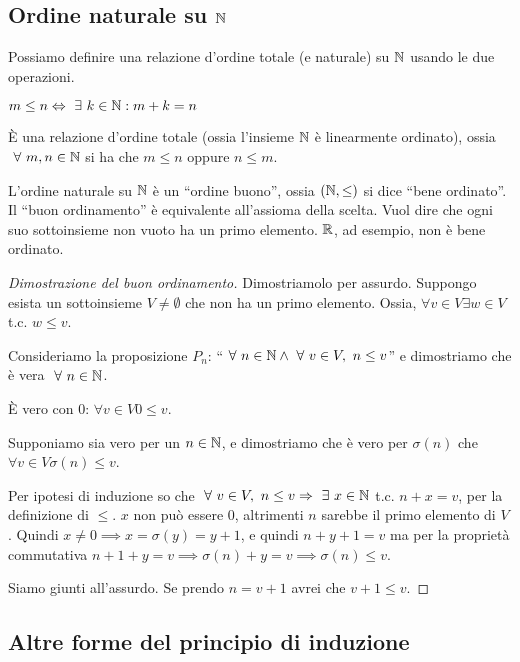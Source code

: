 \subsection{Ordine naturale su $\mathbb{N}$}

Possiamo definire una relazione d'ordine totale (e naturale) su $\mathbb{N}$ usando le due operazioni.
\begin{defn}
$m \le n \iff \exists k \in \naturals : m + k = n$
\end{defn}
\`E una relazione d'ordine totale (ossia l'insieme $\mathbb{N}$ \`e linearmente ordinato), ossia $\forall m, n \in \naturals$ si ha che $ m \le n$ oppure $n \le m$.

L'ordine naturale su $\mathbb{N}$ \`e un ``ordine buono'', ossia $(\mathbb{N}, \le)$ si dice ``bene ordinato''. Il ``buon ordinamento'' \`e equivalente all'assioma della scelta. Vuol dire che ogni suo sottoinsieme non vuoto ha un primo elemento. $\mathbb{R}$, ad esempio, non \`e bene ordinato.
\begin{proof}[Dimostrazione del buon ordinamento]
Dimostriamolo per assurdo. Suppongo esista un sottoinsieme $V \neq \emptyset$ che non ha un primo elemento. Ossia, $\forall v \in V \exists w \in V$ t.c. $w \le v$.

Consideriamo la proposizione $P_n$: ``$\forall n \in \naturals \land \forall v \in V, \ n \le v$'' e dimostriamo che \`e vera $\forall n \in \naturals$.

\`E vero con 0: $\forall v \in V 0 \le v$.

Supponiamo sia vero per un $n \in \mathbb{N}$, e dimostriamo che \`e vero per $\sigma(n) $ che $ \forall v \in V \sigma(n) \le v$.

Per ipotesi di induzione so che $\forall v \in V, \ n \le v \implies \exists x \in \naturals$ t.c. $n + x = v$, per la definizione di $\le$. $x$ non pu\`o essere 0, altrimenti $n$ sarebbe il primo elemento di $V$. Quindi $x \neq 0 \implies x = \sigma(y) = y + 1$, e quindi $n + y + 1 = v $ ma per la propriet\`a commutativa $n + 1 + y = v \implies \sigma(n) + y = v \implies \sigma(n) \le v$.

Siamo giunti all'assurdo. Se prendo $n = v + 1$ avrei che $v + 1 \le v$.
\end{proof}

\subsection{Altre forme del principio di induzione}

